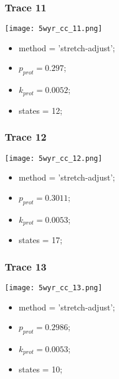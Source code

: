 \subsubsection{Trace 11}
\begin{minipage}[c]{0.7\textwidth}
    \texttt{[image: 5wyr\_cc\_11.png]}
\end{minipage}
\hfill
\begin{minipage}[c]{0.45\textwidth}
    \begin{itemize}
        \item method = 'stretch-adjust';
        \item $p_{prot}=0.297$;
        \item $k_{prot}=0.0052$;
        \item states = 12;
    \end{itemize}
\end{minipage}

\subsubsection{Trace 12}
\begin{minipage}[c]{0.7\textwidth}
    \texttt{[image: 5wyr\_cc\_12.png]}
\end{minipage}
\hfill
\begin{minipage}[c]{0.45\textwidth}
    \begin{itemize}
        \item method = 'stretch-adjust';
        \item $p_{prot}=0.3011$;
        \item $k_{prot}=0.0053$;
        \item states = 17;
    \end{itemize}
\end{minipage}

\subsubsection{Trace 13}
\begin{minipage}[c]{0.7\textwidth}
    \texttt{[image: 5wyr\_cc\_13.png]}
\end{minipage}
\hfill
\begin{minipage}[c]{0.45\textwidth}
    \begin{itemize}
        \item method = 'stretch-adjust';
        \item $p_{prot}=0.2986$;
        \item $k_{prot}=0.0053$;
        \item states = 10;
    \end{itemize}
\end{minipage}

